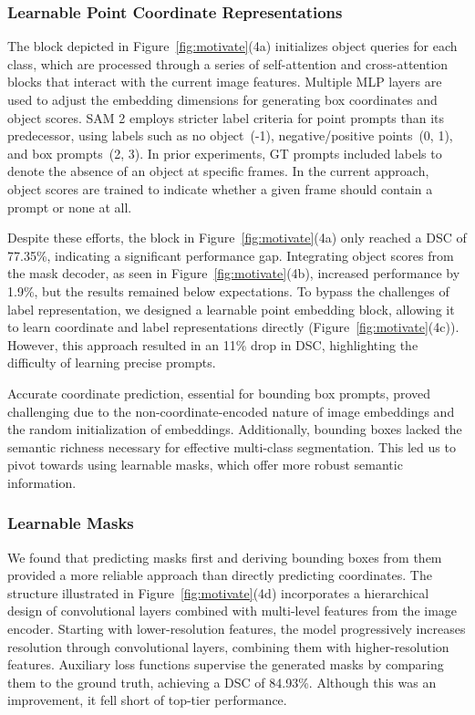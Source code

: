 \subsubsection{Learnable Point Coordinate Representations} 
The block depicted in Figure~\ref{fig:motivate}(4a) initializes object queries for each class, which are processed through a series of self-attention and cross-attention blocks that interact with the current image features. Multiple MLP layers are used to adjust the embedding dimensions for generating box coordinates and object scores. SAM 2 employs stricter label criteria for point prompts than its predecessor, using labels such as no object~(-1), negative/positive points~(0, 1), and box prompts~(2, 3). In prior experiments, GT prompts included labels to denote the absence of an object at specific frames. In the current approach, object scores are trained to indicate whether a given frame should contain a prompt or none at all.

Despite these efforts, the block in Figure~\ref{fig:motivate}(4a) only reached a DSC of 77.35\%, indicating a significant performance gap. Integrating object scores from the mask decoder, as seen in Figure~\ref{fig:motivate}(4b), increased performance by 1.9\%, but the results remained below expectations. To bypass the challenges of label representation, we designed a learnable point embedding block, allowing it to learn coordinate and label representations directly (Figure~\ref{fig:motivate}(4c)). However, this approach resulted in an 11\% drop in DSC, highlighting the difficulty of learning precise prompts.%

Accurate coordinate prediction, essential for bounding box prompts, proved challenging due to the non-coordinate-encoded nature of image embeddings and the random initialization of embeddings. Additionally, bounding boxes lacked the semantic richness necessary for effective multi-class segmentation. This led us to pivot towards using learnable masks, which offer more robust semantic information.

\subsubsection{Learnable Masks} 
We found that predicting masks first and deriving bounding boxes from them provided a more reliable approach than directly predicting coordinates. The structure illustrated in Figure~\ref{fig:motivate}(4d) incorporates a hierarchical design of convolutional layers combined with multi-level features from the image encoder. Starting with lower-resolution features, the model progressively increases resolution through convolutional layers, combining them with higher-resolution features. Auxiliary loss functions supervise the generated masks by comparing them to the ground truth, achieving a DSC of 84.93\%. Although this was an improvement, it fell short of top-tier performance.

